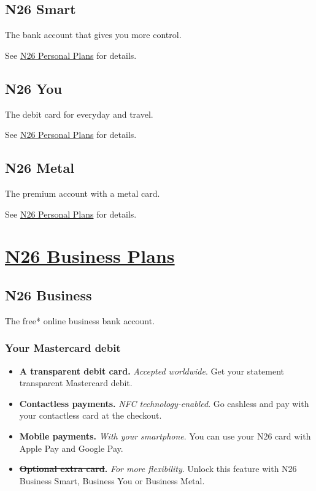 \documentclass[onsided]{book}
\numberwithin{equation}{section}
\begin{document}
\subsection{N26 Smart}
The bank account that gives you more control.

See \href{https://n26.com/en-de/plans}{N26 Personal Plans} for details.

\subsection{N26 You}
The debit card for everyday and travel.

See \href{https://n26.com/en-de/plans}{N26 Personal Plans} for details.

\subsection{N26 Metal}
The premium account with a metal card.

See \href{https://n26.com/en-de/plans}{N26 Personal Plans} for details.

\section{\href{https://n26.com/en-de/plans-business}{N26 Business Plans}}

\subsection{N26 Business}
The free* online business bank account.

\subsubsection{Your Mastercard debit}
\begin{itemize}
    \item \textbf{A transparent debit card.} \textit{Accepted worldwide}. Get your statement transparent Mastercard debit.
    \item \textbf{Contactless payments.} \textit{NFC technology-enabled}. Go cashless and pay with your contactless card at the checkout.
    \item \textbf{Mobile payments.} \textit{With your smartphone}. You can use your N26 card with Apple Pay and Google Pay.
    \item \textbf{\st{Optional extra card}.} \textit{For more flexibility}. Unlock this feature with N26 Business Smart, Business You or Business Metal.
\end{itemize}
\end{document}
